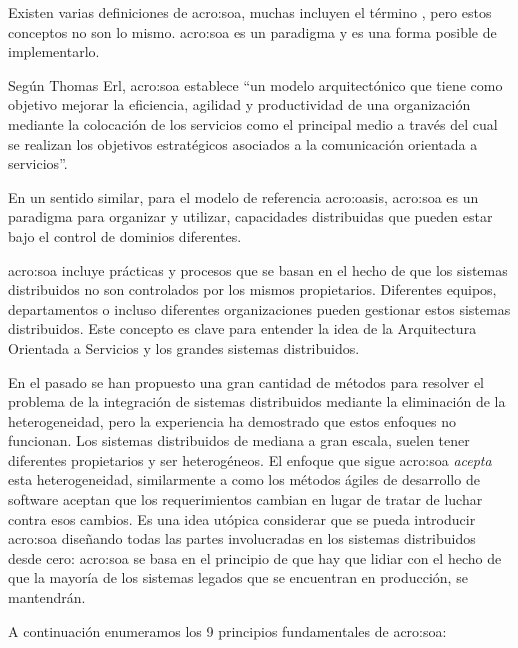 Existen varias definiciones de \gls{acro:soa}, muchas incluyen el término , pero estos conceptos no son lo mismo. \gls{acro:soa} es un paradigma y  es una forma posible de implementarlo.

Según Thomas Erl\cite{principlesofdesign:erl}, \gls{acro:soa} establece ``un modelo arquitectónico que tiene como objetivo mejorar la eficiencia, agilidad y productividad de una organización mediante la colocación de los servicios como el principal medio a través del cual se realizan los objetivos estratégicos asociados a la comunicación orientada a servicios''.

En un sentido similar, para el modelo de referencia \gls{acro:oasis}, \gls{acro:soa} es un paradigma para organizar y utilizar, capacidades distribuidas que pueden estar bajo el control de dominios diferentes.

\gls{acro:soa} incluye prácticas y procesos que se basan en el hecho de que los sistemas distribuidos no son controlados por los mismos propietarios. Diferentes equipos, departamentos o incluso diferentes organizaciones pueden gestionar estos sistemas distribuidos. Este concepto es clave para entender la idea de la Arquitectura Orientada a Servicios y los grandes sistemas distribuidos.

En el pasado se han propuesto una gran cantidad de métodos para resolver el problema de la integración de sistemas distribuidos mediante la eliminación de la heterogeneidad, pero la experiencia ha demostrado que estos enfoques no funcionan\cite[p.~14]{josuttis2007}. Los sistemas distribuidos de mediana a gran escala, suelen tener diferentes propietarios y ser heterogéneos. El enfoque que sigue \gls{acro:soa} \textit{acepta} esta heterogeneidad, similarmente a como los métodos ágiles de desarrollo de software aceptan que los requerimientos cambian en lugar de tratar de luchar contra esos cambios. Es una idea utópica considerar que se pueda introducir \gls{acro:soa} diseñando todas las partes involucradas en los sistemas distribuidos desde cero: \gls{acro:soa} se basa en el principio de que hay que lidiar con el hecho de que la mayoría de los sistemas legados que se encuentran en producción, se mantendrán\cite[p.~15]{josuttis2007}.

A continuación enumeramos los 9 principios fundamentales de \gls{acro:soa}:

